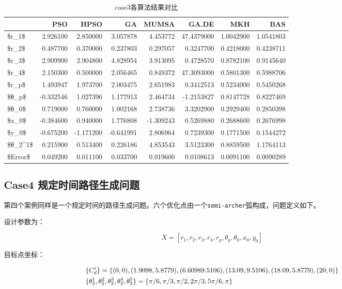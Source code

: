 \documentclass[]{ctexbook}
\theoremstyle{definition}
\theoremstyle{definition}
\theoremstyle{definition}
\theoremstyle{remark}
\begin{document}
\begin{table}

\caption{\label{tab:case3table}case3各算法结果对比}
\centering
\begin{tabular}[t]{lrrrrrrr}
\toprule
  & PSO & HPSO & GA & MUMSA & GA.DE & MKH & BAS\\
\midrule
\$r\_1\$ & 2.926100 & 2.850000 & 3.057878 & 4.453772 & 47.4379000 & 1.0042900 & 1.0541803\\
\$r\_2\$ & 0.487700 & 0.370000 & 0.237803 & 0.297057 & 0.3247700 & 0.4218000 & 0.4238711\\
\$r\_3\$ & 2.909900 & 2.904800 & 4.828954 & 3.913095 & 0.4728570 & 0.8782100 & 0.9145640\\
\$r\_4\$ & 2.150300 & 0.500000 & 2.056465 & 0.849372 & 47.3093000 & 0.5801300 & 0.5988706\\
\$r\_p\$ & 1.493947 & 1.973700 & 2.003475 & 2.651983 & 0.3412513 & 0.5234000 & 0.5450268\\
\addlinespace
\$θ\_p\$ & -0.332546 & 1.027396 & 1.177913 & 2.464734 & -1.2153827 & 0.8147728 & 0.8227469\\
\$θ\_0\$ & 0.719000 & 0.760000 & 1.002168 & 2.738736 & 3.3202900 & 0.2929400 & 0.2850398\\
\$x\_0\$ & -0.384600 & 0.940000 & 1.776808 & -1.309243 & 0.5269880 & 0.2688600 & 0.2676998\\
\$y\_0\$ & -0.675200 & -1.171200 & -0.641991 & 2.806964 & 0.7239300 & 0.1771500 & 0.1544272\\
\$θ\_2\textasciicircum{}1\$ & 0.215900 & 0.513400 & 0.226186 & 4.853543 & 3.5123300 & 0.8859500 & 1.1764113\\
\$Error\$ & 0.049200 & 0.011100 & 0.033700 & 0.019600 & 0.0108613 & 0.0091100 & 0.0090289\\
\bottomrule
\end{tabular}
\end{table}

\subsection{Case4 规定时间路径生成问题}\label{case4-}

第四个案例同样是一个规定时间的路径生成问题。六个优化点由一个\texttt{semi-archer}弧构成，问题定义如下。

设计参数为：

\[
X = [r_1,r_2,r_3,r_4,r_p,\theta_p,\theta_0,x_0,y_0]
\]

目标点坐标：

\begin{align}
&\{C_d^i\} = \{(0,0),(1.9098,5.8779),(6.60989.5106),(13.09,9.5106),(18.09,5.8779),(20,0)\} \notag \\
&\{\theta_2^1,\theta_2^2,\theta_2^3,\theta_2^4,\theta_2^5\}=\{\pi/6,\pi/3,\pi/2,2\pi/3,5\pi/6,\pi\} \notag \\
\end{align}
\end{document}
